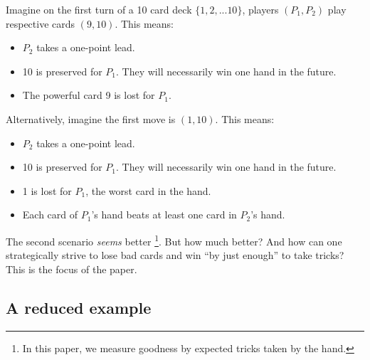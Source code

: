 \documentclass[11pt, oneside]{article} 	%
\begin{document}
Imagine on the first turn of a 10 card deck $\{1, 2, ... 10\}$, players $(P_1, P_2)$ play respective cards $(9, 10)$.  This means:
\begin{itemize}
\item $P_2$ takes a one-point lead.
\item 10 is preserved for $P_1$.  They will necessarily win one hand in the future.
\item The powerful card 9 is lost for $P_1$.
\end{itemize}

Alternatively, imagine the first move is $(1,10)$.  This means:

\begin{itemize}
\item $P_2$ takes a one-point lead.
\item 10 is preserved for $P_1$.  They will necessarily win one hand in the future.
\item 1 is lost for $P_1$, the worst card in the hand.
\item Each card of $P_1$'s hand beats at least one card in $P_2$'s hand.
\end{itemize}

The second scenario \emph{seems} better \footnote{In this paper, we measure goodness by expected tricks taken by the hand.}.  But how much better?  And how can one strategically strive to lose bad cards and win ``by just enough'' to take tricks?  This is the focus of the paper.

\subsection{A reduced example}
\end{document}
